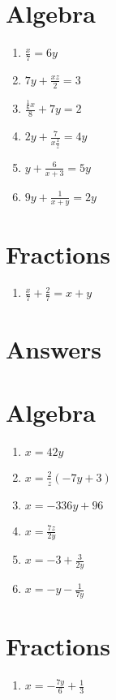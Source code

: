 \documentclass[fleqn]{exam}
\begin{document}
\section{Algebra}

\begin{multicols}{2}
\begin{enumerate}[label=(\alph*)]
\item $ \displaystyle \frac{x}{7} = 6 y$
\item $ \displaystyle 7 y + \frac{x z}{2} = 3$
\item $ \displaystyle \frac{\frac{1}{6} x}{8} + 7 y = 2$
\item $ \displaystyle 2 y + \frac{7}{x \frac{1}{z}} = 4 y$
\item $ \displaystyle y + \frac{6}{x + 3} = 5 y$
\item $ \displaystyle 9 y + \frac{1}{x + y} = 2 y$

\end{enumerate}
\end{multicols}

\section{Fractions}

\begin{multicols}{2}
\begin{enumerate}[label=(\alph*)]
\item $ \displaystyle \frac{x}{7} + \frac{2}{7} = x + y$

\end{enumerate}
\end{multicols}

\newpage
\section*{Answers}

\section{Algebra}

\begin{multicols}{2}
\begin{enumerate}[label=(\alph*)]
\item $ \displaystyle x = 42 y$
\item $ \displaystyle x = \frac{2}{z} \left(- 7 y + 3\right)$
\item $ \displaystyle x = - 336 y + 96$
\item $ \displaystyle x = \frac{7 z}{2 y}$
\item $ \displaystyle x = -3 + \frac{3}{2 y}$
\item $ \displaystyle x = - y - \frac{1}{7 y}$

\end{enumerate}
\end{multicols}

\section{Fractions}

\begin{multicols}{2}
\begin{enumerate}[label=(\alph*)]
\item $ \displaystyle x = - \frac{7 y}{6} + \frac{1}{3}$

\end{enumerate}
\end{multicols}
\end{document}
